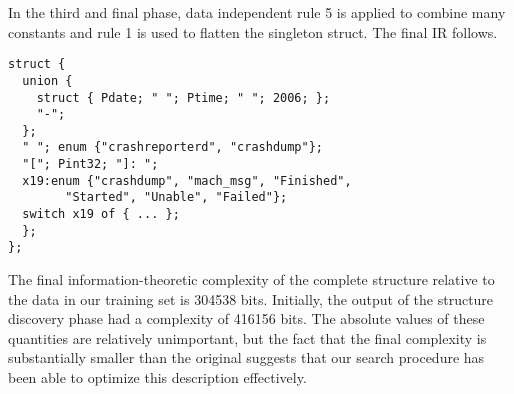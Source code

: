 

In the third and final phase, 
data independent rule 5  is applied to combine many constants 
and rule 1 is used to flatten the singleton struct. The final IR follows.

{\small
\begin{verbatim}
struct {
  union {
    struct { Pdate; " "; Ptime; " "; 2006; };
    "-";
  };
  " "; enum {"crashreporterd", "crashdump"};
  "["; Pint32; "]: ";
  x19:enum {"crashdump", "mach_msg", "Finished", 
        "Started", "Unable", "Failed"};
  switch x19 of { ... };
  };
};
\end{verbatim}
}

The final information-theoretic complexity of the complete structure 
relative to the data in our training set is 304538 bits. 
Initially, the output of the structure discovery phase had a 
complexity of 416156 bits.  The absolute values of these quantities
are relatively unimportant, but the fact that the final complexity
is substantially smaller than the original suggests that our search
procedure has been able to optimize this description effectively.



